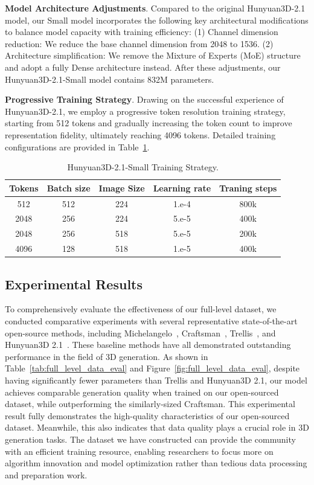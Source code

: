 \documentclass{article} %
\begin{document}
\textbf{Model Architecture Adjustments}. Compared to the original Hunyuan3D-2.1 model, our Small model incorporates the following key architectural modifications to balance model capacity with training efficiency: (1) Channel dimension reduction: We reduce the base channel dimension from 2048 to 1536. (2) Architecture simplification: We remove the Mixture of Experts (MoE) structure and adopt a fully Dense architecture instead. After these adjustments, our Hunyuan3D-2.1-Small model contains 832M parameters.

\textbf{Progressive Training Strategy}. Drawing on the successful experience of Hunyuan3D-2.1, we employ a progressive token resolution training strategy, starting from 512 tokens and gradually increasing the token count to improve representation fidelity, ultimately reaching 4096 tokens. Detailed training configurations are provided in Table~\ref{tab:full_level_data_train}.

\begin{table}[h]
    \centering
    \begin{tabular}{c||c|c|c|c}
    \hline
         Tokens &  Batch size & Image Size & Learning rate & Traning steps \\
    \hline
         512 & 512 & 224 & 1.e-4 & 800k \\
         2048 & 256 & 224 & 5.e-5 & 400k \\
         2048 & 256 & 518 & 5.e-5 & 200k \\
         4096 & 128 & 518 & 1.e-5 & 400k \\
    \hline
    \end{tabular}
    \caption{Hunyuan3D-2.1-Small Training Strategy.}
    \label{tab:full_level_data_train}
\end{table}

\subsection{Experimental Results}

To comprehensively evaluate the effectiveness of our full-level dataset, we conducted comparative experiments with several representative state-of-the-art open-source methods, including Michelangelo~\cite{zhao2024michelangelo}, Craftsman~\cite{li2024craftsman}, Trellis~\cite{xiang2024structured}, and Hunyuan3D 2.1~\cite{hunyuan3d2025hunyuan3d}. These baseline methods have all demonstrated outstanding performance in the field of 3D generation. As shown in Table~\ref{tab:full_level_data_eval} and Figure~\ref{fig:full_level_data_eval}, despite having significantly fewer parameters than Trellis and Hunyuan3D 2.1, our model achieves comparable generation quality when trained on our open-sourced dataset, while outperforming the similarly-sized Craftsman. This experimental result fully demonstrates the high-quality characteristics of our open-sourced dataset. Meanwhile, this also indicates that data quality plays a crucial role in 3D generation tasks. The dataset we have constructed can provide the community with an efficient training resource, enabling researchers to focus more on algorithm innovation and model optimization rather than tedious data processing and preparation work.
\end{document}

